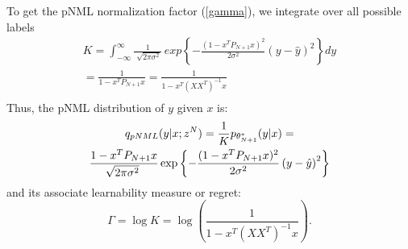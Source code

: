 \documentclass[conference,letterpaper]{IEEEtran}
\begin{document}
To get the pNML normalization factor (\ref{gamma}), we integrate over all possible labels
\begin{multline}
K = %
\int_{-\infty}^{\infty} \frac{1}{\sqrt[]{2\pi\sigma^2}}
\ exp\left\{-\frac{(1 - x^T P_{N+1} x )^2 }{2\sigma^2}
\left(y- \hat{y} \right)^2\right\} dy\\ 
=\frac{1}{1 - x^T P_{N+1} x } 
=\frac{1}{1 - x^T (XX^T)^{-1} x } \\
\end{multline}
Thus, the pNML distribution of $y$ given $x$ is:
\begin{multline}
q_{\mbox{\tiny{pNML}}}(y | x; z^N) = \frac{1}{K}p_{\theta_{N+1}^*}(y|x) = \\
\frac{1 - x^T P_{N+1} x }{\sqrt[]{2\pi\sigma^2}}
\exp\left\{-\frac{(1 - x^T P_{N+1} x )^2 }{2\sigma^2}\left(y-\hat{y} \right)^2\right\} \\
\end{multline}
and its associate learnability measure or regret:
\begin{equation} \label{eq:regret}
\Gamma = \log K = \log\left(\frac{1}{1 - x^T (XX^T)^{-1} x } \right).
\end{equation}

\end{document}
